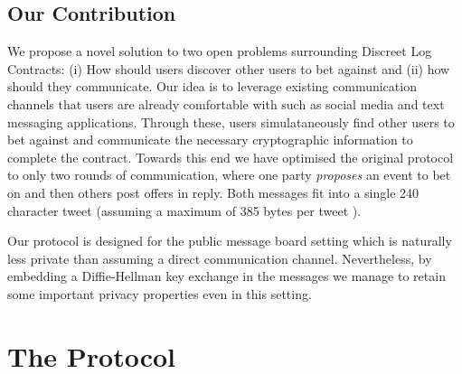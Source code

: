 \documentclass[runningheads]{llncs}
\begin{document}
\subsection{Our Contribution}

We propose a novel solution to two open problems surrounding Discreet Log Contracts: (i) How should users discover other users to bet against and (ii) how should they communicate. Our idea is to leverage existing communication channels that users are already comfortable with such as social media and text messaging applications. Through these, users simulataneously find other users to bet against and communicate the necessary cryptographic information to complete the contract. Towards this end we have optimised the original protocol to only two rounds of communication, where one party \emph{proposes} an event to bet on and then others post offers in reply. Both messages fit into a single 240 character tweet (assuming a maximum of 385 bytes per tweet \cite{base2048}).

Our protocol is designed for the public message board setting which is naturally less private than assuming a direct communication channel. Nevertheless, by embedding a Diffie-Hellman key exchange in the messages we manage to retain some important privacy properties even in this setting.

\section{The Protocol}
\newcommand{\Rec}{\textsf{Rec}}
\newcommand{\bet}{\beta}
\newcommand{\hatsigma}{\hat{\sigma}}
\newcommand{\Fund}{\textsf{Fund}}
\newcommand{\Outcome}{\textsf{Outcome}}
\newcommand{\KeyGen}{\textsf{KeyGen}}
\newcommand{\win}{\textsf{win}}
\newcommand{\Verify}{\textsf{Vrfy}}
\newcommand{\Tx}{\textsf{Tx}}
\newcommand{\EncVer}{\textsf{EncVrfy}}
\newcommand{\Pdleq}{\pcalgostyle{P}_{\textsf{DLEQ}}}
\newcommand{\Vdleq}{\pcalgostyle{V}_{\textsf{DLEQ}}}
\newcommand{\change}{\textsf{change}}
\newcommand{\val}{\textsf{val}}
\newcommand{\OPCHECKMULTISIG}{\texttt{OP\_CHECKMULTISIG}}
\newcommand{\OPCMS}{\texttt{OP\_CMS}_{\text{1-of-2}}}
\newcommand{\fee}{\textsf{fee}}
\newcommand{\Sign}{\textsf{Sign}}
\newcommand{\EncSign}{\textsf{EncSign}}
\newcommand{\Rx}{R_\texttt{x}}
\newcommand{\DecSig}{\textsf{DecSig}}
\newcommand{\TxGen}{\textsf{TxGen}}
\newcommand{\eventid}{\textsf{event\_id}}
\newcommand{\PRG}{\textsf{PRG}}
\newcommand{\HKDF}{H_{\textsf{KDF}}}
\newcommand{\G}{\mathbb{G}}
\newcommand{\Enc}{\textsf{Enc}}
\newcommand{\Dec}{\textsf{Dec}}
\newcommand{\VrfyWitness}{\textsf{VerifyWitness}}
\newcommand{\GenFund}{\textsf{GenFund}}
\newcommand{\GenWitness}{\textsf{Witness}}
\newcommand{\Value}{\textsf{Value}}
\end{document}
